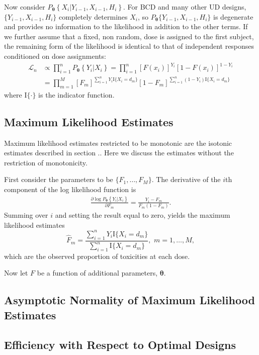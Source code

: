 Now consider $P_{\boldsymbol{\theta}}\left\{	X_i\vert  Y_{i-1}, X_{i-1}, H_i	\right\}$.  For BCD and many other UD designs, 
$\{Y_{i-1}, X_{i-1}, H_i	\}$ completely determines $X_i$, so $P_{\boldsymbol{\theta}}\{Y_{i-1}, X_{i-1}, H_i	\}$ is degenerate and provides no information to the likelihood in addition to the other terms.  If we further assume that a fixed, non random, dose is assigned to the first subject, the remaining form of the likelihood is identical to that of independent responses conditioned on dose assignments:
 \begin{align}\label{eq:LK}
\mathcal{L}_n
&\propto
\prod_{i=1}^n P_{\boldsymbol{\theta}}\left\{ 	Y_i\vert X_i	\right\}=\prod_{i=1}^n [F(x_i)]^{Y_i} [1-F(x_i)]^{1-Y_i}\\
&=\prod_{m=1}^M [F_m]^{\sum_{i=1}^n Y_i \textrm{I}\{X_i=d_m\}} [1-F_m]^{\sum_{i=1}^n (1-Y_i) \textrm{I}\{X_i=d_m\}}
\end{align}
where $\textrm{I}\{\cdot\}$ is the indicator function.

\subsection{Maximum Likelihood Estimates}
Maximum likelihood estimates restricted to be monotonic are the isotonic estimates described in section ..  Here we discuss the estimates without the restriction of monotonicity.

First consider the parameters to be $\{F_1, \ldots, F_M\}$.  The derivative of the $i$th component of the log likelihood function is
\begin{align}
\frac{\partial \log P_{\boldsymbol{\theta}}\left\{ 	Y_i\vert X_i	\right\}}{\partial F_m}=\frac{Y_i-F_m}{F_m(1-F_m)}.
\end{align}
Summing over $i$ and setting the result equal to zero, yields the maximum likelihood estimates $$\widehat F_m=\frac{\sum_{i=1}^nY_i  \textrm{I}\{X_i=d_m\}}{\sum_{i=1}^n \textrm{I}\{X_i=d_m\}},\, \, 
m=1,\ldots,M,$$
which are the observed proportion of toxicities at each dose.

Now let $F$ be a function of additional parameters, $\boldsymbol{\theta}$.


\subsection{Asymptotic Normality of Maximum Likelihood Estimates}

\subsection{Efficiency  with Respect to Optimal Designs}

